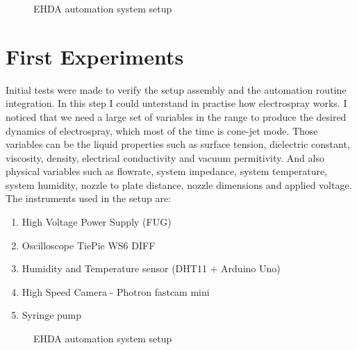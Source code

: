 
\begin{figure}[H]
  \centering
  \caption{EHDA automation system setup}
  \label{fig:setup}
\end{figure}


\section{First Experiments}
\label{sec:first_experiments}

Initial tests were made to verify the setup assembly and the automation routine integration. In this step I could unterstand in practise how electrospray works.
I noticed that we need a large set of variables in the range to produce the desired dynamics of electrospray, which most of the time is cone-jet mode. Those variables can be the liquid properties such as surface tension, dielectric constant, viscosity, density, electrical conductivity and vacuum permitivity. And also physical variables such as flowrate, system impedance, system temperature, system humidity, nozzle to plate distance, nozzle dimensions and applied voltage.
The instruments used in the setup are:

\begin{enumerate}[a]
  \item High Voltage Power Supply (FUG)
  \item Oscilloscope TiePie WS6 DIFF 
  \item Humidity and Temperature sensor (DHT11 + Arduino Uno)
  \item High Speed Camera - Photron fastcam mini
  \item Syringe pump
  \end{enumerate}

\begin{figure}[H]
  \centering
  \caption{EHDA automation system setup}
  \label{fig:microdripping_current_pic}
\end{figure}

\clearpage
